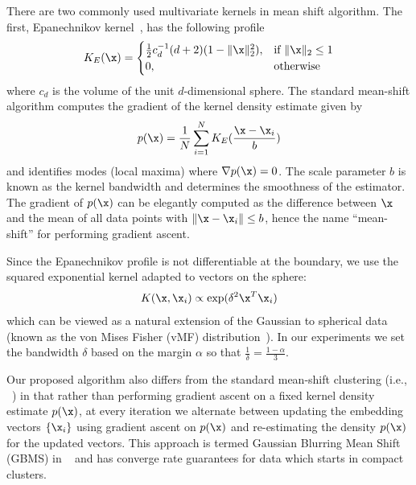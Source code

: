 There are two commonly used multivariate kernels in mean shift algorithm.  The
first, Epanechnikov kernel~\cite{epanechnikov1969non,cheng1995mean}, has the
following profile
\begin{equation}
K_E(\x)=
\begin{cases}
    \frac{1}{2} c_d^{-1} (d+2) (1-\Vert\x \Vert_2^2),& \text{if } \Vert\x\Vert_2\le 1\\
    0,              & \text{otherwise}
\end{cases}
\end{equation}
where $c_d$ is the volume of the unit $d$-dimensional sphere. The standard
mean-shift algorithm computes the gradient of the kernel density estimate
given by
\[
p(\x) = \frac{1}{N} \sum_{i=1}^N K_E(\frac{\x - \x_i}{b})
\]
and identifies modes (local maxima) where $\nabla p(\x)= 0$. The scale
parameter $b$ is known as the kernel bandwidth and determines the
smoothness of the estimator.  The gradient of $p(\x)$ can be elegantly computed
as the difference between $\x$ and the mean of all data points with $\Vert \x -
\x_i \Vert \leq b$, hence the name ``mean-shift'' for performing gradient
ascent.

Since the Epanechnikov profile is not differentiable at the boundary, we
use the squared exponential kernel adapted to vectors on the sphere:
\begin{equation}
\begin{split}
K(\x,\x_i) & \propto \exp( \delta^2 \x^T \x_i ) \\
\end{split}
\end{equation}
which can be viewed as a natural extension of the Gaussian to spherical data
(known as the von Mises Fisher (vMF)
distribution~\cite{fisher1953dispersion,banerjee2005clustering,mardia2009directional,kobayashi2010mises}).
In our experiments we set the bandwidth $\delta$ based on the margin $\alpha$
so that $\frac{1}{\delta}=\frac{1-\alpha}{3}$.

Our proposed algorithm also differs from the standard mean-shift clustering
(i.e., ~\cite{comaniciu1999mean}) in that rather than performing gradient
ascent on a fixed kernel density estimate $p(\x)$, at every iteration we
alternate between updating the embedding vectors $\{\x_i\}$ using gradient
ascent on $p(\x)$ and re-estimating the density $p(\x)$ for the updated
vectors.  This approach is termed Gaussian Blurring Mean Shift (GBMS) in
~\cite{carreira2008generalised} and has converge rate guarantees for
data which starts in compact clusters.

